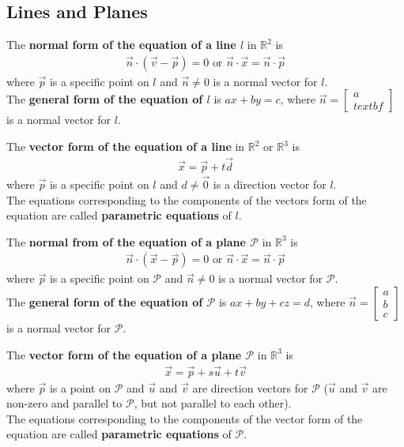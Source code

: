 \documentclass{article}
\begin{document}
\subsection{Lines and Planes}
\begin{definition}
    The \textbf{normal form of the equation of a line $l$} in $\mathbb{R}^2$ is
    \begin{gather*}
        \vec n \cdot (\vec v - \vec p) = 0 \text{  or  } \vec n \cdot \vec x = \vec n \cdot \vec p
    \end{gather*}
    where $\vec p$ is a specific point on $l$ and $\vec n \not= 0$ is a normal vector for $l$.\\
    The \textbf{general form of the equation of $l$} is $ax+by=c$, where $\vec n = \begin{bmatrix}
            a \\textbf
        \end{bmatrix}$ is a normal vector for $l$.
\end{definition}
\begin{definition}
    The \textbf{vector form of the equation of a line} in $\mathbb{R}^2$ or $\mathbb{R}^3$ is
    \begin{gather*}
        \vec x = \vec p + t \vec d
    \end{gather*}
    where $\vec p$ is a specific point on $l$ and $d\not=\vec 0$ is a direction vector for $l$.\\
    The equations corresponding to the components of the vectors form of the equation are called \textbf{parametric equations} of $l$.
\end{definition}
\begin{definition}
    The \textbf{normal from of the equation of a plane $\mathcal{P}$} in $\mathbb{R}^3$ is
    \begin{gather*}
        \vec n \cdot (\vec x - \vec p) = 0 \text{  or  } \vec n \cdot \vec x = \vec n \cdot \vec p
    \end{gather*}
    where $\vec p$ is a specific point on $\mathcal{P}$ and $\vec n \not= 0$ is a normal vector for $\mathcal{P}$.\\
    The \textbf{general form of the equation of $\mathcal{P}$} is $ax + by + cz = d$, where $\vec n = \begin{bmatrix}
            a \\ b \\ c
        \end{bmatrix}$ is a normal vector for $\mathcal{P}$.
\end{definition}
\begin{definition}
    The \textbf{vector form of the equation of a plane $\mathcal{P}$} in $\mathbb{R}^3$ is
    \begin{gather*}
        \vec x = \vec p + s \vec u + t \vec v
    \end{gather*}
    where $\vec p$ is a point on $\mathcal{P}$ and $\vec u$ and $\vec v$ are direction vectors for $\mathcal{P}$ ($\vec u$ and $\vec v$ are non-zero and parallel to $\mathcal{P}$, but not parallel to each other).\\
    The equations corresponding to the components of the vector form of the equation are called \textbf{parametric equations} of $\mathcal{P}$.
\end{definition}
\end{document}
